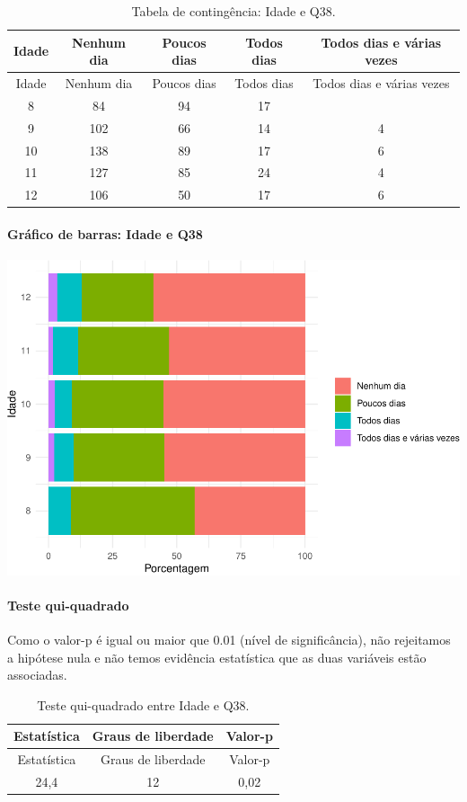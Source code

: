 \documentclass[]{article}
\let\oldparagraph\paragraph
\renewcommand{\paragraph}[1]{\oldparagraph{#1}\mbox{}}
\begin{document}
\begin{longtable}[]{@{}ccccc@{}}
\caption{\label{tab:unnamed-chunk-1448}Tabela de contingência: Idade e Q38.}\tabularnewline
\toprule
Idade & Nenhum dia & Poucos dias & Todos dias & Todos dias e várias vezes\tabularnewline
\midrule
\endfirsthead
\toprule
Idade & Nenhum dia & Poucos dias & Todos dias & Todos dias e várias vezes\tabularnewline
\midrule
\endhead
8 & 84 & 94 & 17 &\tabularnewline
9 & 102 & 66 & 14 & 4\tabularnewline
10 & 138 & 89 & 17 & 6\tabularnewline
11 & 127 & 85 & 24 & 4\tabularnewline
12 & 106 & 50 & 17 & 6\tabularnewline
\bottomrule
\end{longtable}

\hypertarget{gruxe1fico-de-barras-idade-e-q38}{%
\paragraph{Gráfico de barras: Idade e Q38}\label{gruxe1fico-de-barras-idade-e-q38}}

\begin{center}\includegraphics[width=0.75\linewidth]{relatorio_covid19_files/figure-latex/unnamed-chunk-1449-1} \end{center}

\hypertarget{teste-qui-quadrado-124}{%
\paragraph{Teste qui-quadrado}\label{teste-qui-quadrado-124}}

Como o valor-p é igual ou maior que 0.01 (nível de significância), não rejeitamos a hipótese nula e não temos evidência estatística que as duas variáveis estão associadas.

\begin{longtable}[]{@{}ccc@{}}
\caption{\label{tab:unnamed-chunk-1451}Teste qui-quadrado entre Idade e Q38.}\tabularnewline
\toprule
Estatística & Graus de liberdade & Valor-p\tabularnewline
\midrule
\endfirsthead
\toprule
Estatística & Graus de liberdade & Valor-p\tabularnewline
\midrule
\endhead
24,4 & 12 & 0,02\tabularnewline
\bottomrule
\end{longtable}
\end{document}
